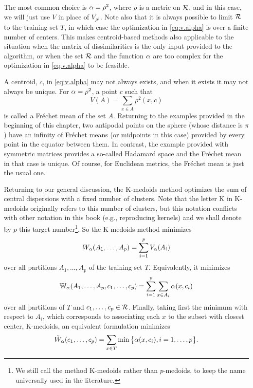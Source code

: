The most common choice is $\alpha = \rho^2$, where $\rho$ is a metric on ${\mathcal R}$, and in this case, we will just use $V$ in place of $V_{\rho^2}$. Note also that it is always possible to limit ${\mathcal R}$ to the training set $T$, in which case the optimization in \cref{eq:v.alpha} is over a finite number of centers. This makes centroid-based methods also applicable to the situation when the matrix of dissimilarities is the only input provided to the algorithm, or when the set ${\mathcal R}$ and the function $\alpha$ are too complex for the optimization in \cref{eq:v.alpha} to be feasible.
\bigskip

A centroid, $c$, in \cref{eq:v.alpha} may not always exists, and when it exists it may not always be unique. For $\alpha = \rho^2$, a point $c$ such that 
\[
V(A) = \sum_{x\in A} \rho^2(x, c)
\]
is called a Fr\'echet mean of the set $A$. Returning to the examples provided in the beginning of this chapter, two antipodal points on the sphere (whose distance is $\pi$) have an infinity of Fr\'echet means (or midpoints in this case) provided by every point in the equator between them. In contrast, the example provided with symmetric matrices provides a so-called Hadamard space \cite{burago2001course} and the Fr\'echet mean in that case is unique.  Of course, for Euclidean metrics, the Fr\'echet mean is just the usual one.


Returning to our general discussion, the K-medoids method optimizes the sum of central dispersions with a fixed number of clusters. Note that the letter K in K-medoids originally refers to this number of clusters, but this notation conflicts with other notation in this book (e.g., reproducing kernels) and we shall denote by $p$ this target number\footnote{We  still call the method K-medoids rather than $p$-medoids, to keep the name universally used in the literature.}. So the K-medoids method minimizes
\[
W_\alpha(A_1, \ldots, A_p) = \sum_{i=1}^p V_\alpha(A_i)
\] 
over all partitions $A_1, \ldots, A_p$ of the training set $T$. Equivalently, it minimizes
\begin{equation}
\label{eq:kmed.2}
{\mathbb W}_\alpha(A_1, \ldots, A_p, c_1, \ldots, c_p) = \sum_{i=1}^p \sum_{x\in A_i} \alpha(x, c_i)
\end{equation}
over all partitions of $T$ and $c_1, \ldots, c_p\in{\mathcal R}$. Finally, taking first the minimum with respect to $A_i$, which corresponds to associating each $x$ to the subset with closest center, K-medoids, an equivalent formulation  minimizes
\[
\tilde W_\alpha(c_1, \ldots, c_p) = \sum_{x\in T} \min\big\{\alpha(x, c_i), i=1, \ldots, p\big\}.
\] 

